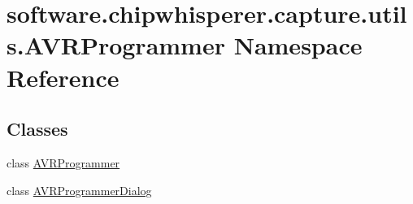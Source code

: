 \hypertarget{namespacesoftware_1_1chipwhisperer_1_1capture_1_1utils_1_1AVRProgrammer}{}\section{software.\+chipwhisperer.\+capture.\+utils.\+A\+V\+R\+Programmer Namespace Reference}
\label{namespacesoftware_1_1chipwhisperer_1_1capture_1_1utils_1_1AVRProgrammer}
\subsection*{Classes}
\begin{DoxyCompactItemize}
\item 
class \hyperlink{classsoftware_1_1chipwhisperer_1_1capture_1_1utils_1_1AVRProgrammer_1_1AVRProgrammer}{A\+V\+R\+Programmer}
\item 
class \hyperlink{classsoftware_1_1chipwhisperer_1_1capture_1_1utils_1_1AVRProgrammer_1_1AVRProgrammerDialog}{A\+V\+R\+Programmer\+Dialog}
\end{DoxyCompactItemize}
